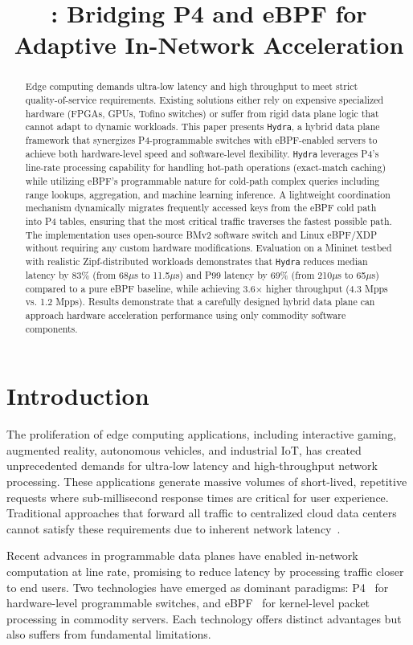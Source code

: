\documentclass[sigconf,anonymous,10pt]{acmart}
\title{\hydra: Bridging P4 and eBPF for Adaptive In-Network Acceleration}
\author{}
\affiliation{}
\newcommand{\hydra}{\texttt{Hydra}}
\begin{document}
\begin{abstract}
Edge computing demands ultra-low latency and high throughput to meet strict quality-of-service requirements. Existing solutions either rely on expensive specialized hardware (FPGAs, GPUs, Tofino switches) or suffer from rigid data plane logic that cannot adapt to dynamic workloads. This paper presents \hydra{}, a hybrid data plane framework that synergizes P4-programmable switches with eBPF-enabled servers to achieve both hardware-level speed and software-level flexibility. \hydra{} leverages P4's line-rate processing capability for handling hot-path operations (exact-match caching) while utilizing eBPF's programmable nature for cold-path complex queries including range lookups, aggregation, and machine learning inference. A lightweight coordination mechanism dynamically migrates frequently accessed keys from the eBPF cold path into P4 tables, ensuring that the most critical traffic traverses the fastest possible path. The implementation uses open-source BMv2 software switch and Linux eBPF/XDP without requiring any custom hardware modifications. Evaluation on a Mininet testbed with realistic Zipf-distributed workloads demonstrates that \hydra{} reduces median latency by 83\% (from 68$\mu$s to 11.5$\mu$s) and P99 latency by 69\% (from 210$\mu$s to 65$\mu$s) compared to a pure eBPF baseline, while achieving 3.6$\times$ higher throughput (4.3 Mpps vs. 1.2 Mpps). Results demonstrate that a carefully designed hybrid data plane can approach hardware acceleration performance using only commodity software components.
\end{abstract}

\section{Introduction}
\label{sec:intro}

The proliferation of edge computing applications, including interactive gaming, augmented reality, autonomous vehicles, and industrial IoT, has created unprecedented demands for ultra-low latency and high-throughput network processing. These applications generate massive volumes of short-lived, repetitive requests where sub-millisecond response times are critical for user experience. Traditional approaches that forward all traffic to centralized cloud data centers cannot satisfy these requirements due to inherent network latency~\cite{edge-survey}.

Recent advances in programmable data planes have enabled in-network computation at line rate, promising to reduce latency by processing traffic closer to end users. Two technologies have emerged as dominant paradigms: P4~\cite{p4} for hardware-level programmable switches, and eBPF~\cite{ebpf,xdp} for kernel-level packet processing in commodity servers. Each technology offers distinct advantages but also suffers from fundamental limitations.
\end{document}
